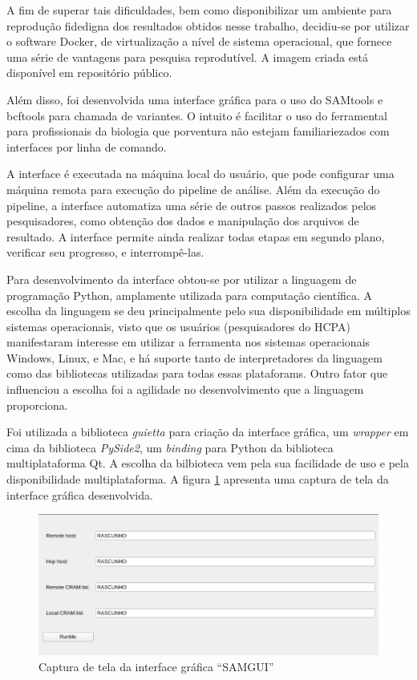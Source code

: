 \documentclass[cic,tc]{iiufrgs}
\begin{document}
A fim de superar tais dificuldades, bem como disponibilizar um ambiente para
reprodução fidedigna dos resultados obtidos nesse trabalho, decidiu-se por
utilizar o software Docker, de virtualização a nível de sistema operacional,
que fornece uma série de vantagens para pesquisa
reprodutível.\cite{boettiger2015introduction} A imagem criada está disponível
em repositório público.\cite{dockerme}

Além disso, foi desenvolvida uma interface gráfica para o uso do SAMtools e
bcftools para chamada de variantes. O intuito é facilitar o uso do ferramental
para profissionais da biologia que porventura não estejam familiariezados com
interfaces por linha de comando.

A interface é executada na máquina local do usuário, que pode configurar uma
máquina remota para execução do pipeline de análise. Além da execução do
pipeline, a interface automatiza uma série de outros passos realizados pelos
pesquisadores, como obtenção dos dados e manipulação dos arquivos de resultado.
A interface permite ainda realizar todas etapas em segundo plano, verificar seu
progresso, e interrompê-las.

Para desenvolvimento da interface obtou-se por utilizar a linguagem de
programação Python, amplamente utilizada para computação
científica.\cite{oliphant2007python} A escolha da linguagem se deu
principalmente pelo sua disponibilidade em múltiplos sistemas operacionais,
visto que os usuários (pesquisadores do HCPA) manifestaram interesse em
utilizar a ferramenta nos sistemas operacionais Windows, Linux, e Mac, e há
suporte tanto de interpretadores da linguagem como das bibliotecas utilizadas
para todas essas plataforams.\cite{oliphant2007python} Outro fator que
influenciou a escolha foi a agilidade no desenvolvimento que a linguagem
proporciona.\cite{oliphant2007python}

Foi utilizada a biblioteca \textit{guietta} para criação da interface
gráfica,\cite{guietta} um \textit{wrapper} em cima da biblioteca
\textit{PySide2}, um \textit{binding} para Python da biblioteca multiplataforma
Qt.\cite{loganathan2013pyside} A escolha da bilbioteca vem pela sua facilidade
de uso e pela disponibilidade multiplataforma. A figura \ref{fig:samgui}
apresenta uma captura de tela da interface gráfica desenvolvida.

\begin{figure}
  \caption{Captura de tela da interface gráfica ``SAMGUI''}
    \begin{center}
      \includegraphics[width=0.85\linewidth]{img/samgui.png}
    \end{center}
    \label{fig:samgui}
\end{figure}



\end{document}
